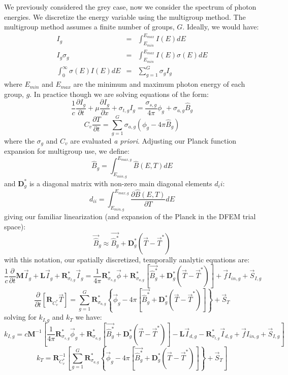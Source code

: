 \documentclass[11pt]{article}
\newcommand{\benum}{\begin{equation}}
\newcommand{\eenum}{\end{equation}}
\newcommand{\be}{\begin{equation*}}
\newcommand{\ee}{\end{equation*}}
\newcommand{\bea}{\begin{eqnarray*}}
\newcommand{\eea}{\end{eqnarray*}}
\newcommand{\p}{\ensuremath{ \partial}}
\newcommand{\M}{\ensuremath{ \mathbf M}}
\newcommand{\R}{\ensuremath{{\mathbf R}}}
\newcommand{\Rag}{\ensuremath{{\mathbf R}_{\sigma_{a,g}}^*}}
\newcommand{\Rsg}{\ensuremath{{\mathbf R}_{\sigma_{s,g}}^*}}
\newcommand{\Rtg}{\ensuremath{{\mathbf R}_{\sigma_{t,g}}^*}}
\newcommand{\Dg}{\ensuremath{ \mathbf D}^*_g}
\newcommand{\Pgvec}{\ensuremath{ \vec{\widehat{B}^*_g}}}
\begin{document}
We previously considered the grey case, now we consider the spectrum of photon energies.
We discretize the energy variable using the multigroup method.  
The multigroup method assumes a finite number of groups, $G$.  
Ideally, we would have:
\bea
I_g &=& \int_{E_{min}}^{E_{max}}{I(E) dE} \\
I_g \sigma_g &=& \int_{E_{min}}^{E_{max}}{I(E)\sigma(E)dE} \\
\int_{0}^{\infty}{\sigma(E)I(E) dE} &=& \sum_{g=1}^G{\sigma_g I_g} 
\eea
where $E_{min}$ and $E_{max}$ are the minimum and maximum photon energy of each group, $g$. 
In practice though we are solving equations of the form:
\benum
\frac{1}{c}\frac{\p I_g}{\p t} + \mu\frac{\p I_g}{\p x} + \sigma_{t,g}I_g= \frac{\sigma_{s,g}}{4\pi} \phi_g + \sigma_{a,g} \widehat{B}_g
\eenum
\benum
C_v \frac{\p T}{\p t} = \sum_{g=1}^G{\sigma_{a,g}\left(\phi_g - 4\pi \widehat{B}_g  \right)}
\eenum
where the $\sigma_g$ and $C_v$ are evaluated {\em a priori}.
Adjusting our Planck function expansion for multigroup use, we define:
\be
\widehat{B}_g = \int_{E_{min,g}}^{E_{max,g}}{ \widehat{B} (E,T) dE}
\ee
%
%
and ${\mathbf D}_g^*$ is a diagonal matrix with non-zero main diagonal elements $d_ii$:
\be
d_{ii} = \int_{E_{min,g}}^{E_{max,g}}{\frac{\p \widehat{B}(E,T)}{\p T} dE}  
\ee
giving our familiar linearization (and expansion of the Planck in the DFEM trial space):
\be
\vec{\widehat{B}}_g \approx \Pgvec + \Dg \left(\vec{T} - \vec{T}^*  \right)
\ee
with this notation, our spatially discretized, temporally analytic equations are:
\benum
\frac{1}{c}\frac{\p}{\p t}\M \vec{I}_{g} + \mathbf{L} \vec{I}_{g} + \Rtg \vec{I}_{g}= \frac{1}{4\pi} \Rsg \vec{\phi} + \Rag \left[\Pgvec + \Dg \left(\vec{T}- \vec{T}^*  \right)  \right] + \vec{f}I_{in,g} + \vec{S}_{I,g}
\label{eq:multi-group-intensity}
\eenum
\benum
\frac{\p}{\p t} \left[\R_{C_v^*} \vec{T}  \right] = \sum_{g=1}^G{\Rag \left \{ \vec{\phi}_g - 4\pi\left[\Pgvec  +   \Dg \left(\vec{T} - \vec{T}^*  \right)\right]   \right \} }  + \vec{S}_T
\label{eq:multi-group-temperature}
\eenum
solving for $k_{I,g}$ and $k_{T}$ we have:
\benum
k_{I,g} = c\M^{-1}\left[ \frac{1}{4\pi} \Rsg \vec{\phi}_g + \Rag \left[ \Pgvec+ \Dg \left(\vec{T}- \vec{T}^*  \right)  \right] - \mathbf{L} \vec{I}_{d,g} - \Rtg \vec{I}_{d,g} + \vec{f}I_{in,g} + \vec{S}_{I,g} \right]
\label{eq:kI_multi}
\eenum
\benum
k_T = \R_{C_v^*}^{-1}\left[\sum_{g=1}^G{\Rag \left \{ \vec{\phi}_g - 4\pi\left[ \Pgvec +   \Dg \left(\vec{T} - \vec{T}^*  \right)\right]   \right \} } + \vec{S}_T \right]
\label{eq:kT_multi}
\eenum
\end{document}

